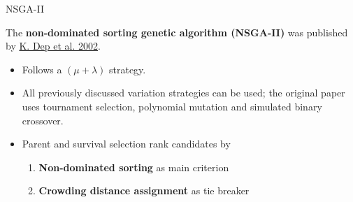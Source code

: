 \documentclass[11pt,compress,t,notes=noshow, xcolor=table]{beamer}
\begin{document}







\begin{vbframe}{NSGA-II}

The \textbf{non-dominated sorting genetic algorithm (NSGA-II)} was published by {\href{https://www.iitk.ac.in/kangal/Deb_NSGA-II.pdf}{K. Dep et al. 2002}}.

\begin{itemize}
\item Follows a $(\mu + \lambda)$ strategy.
\item All previously discussed variation strategies can be used; 
    the original paper uses tournament selection, polynomial mutation and simulated binary crossover.
\item Parent and survival selection rank candidates by 
\begin{enumerate}
\item \textbf{Non-dominated sorting} as main criterion
\item \textbf{Crowding distance assignment} as tie breaker
\end{enumerate}
\end{itemize}

\end{vbframe}
\end{document}
